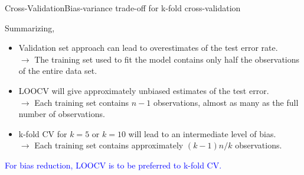 \begin{frame}{Cross-Validation}{Bias-variance trade-oﬀ for k-fold cross-validation}

Summarizing, 

\begin{itemize}
    \item Validation set approach can lead to overestimates of the test error rate. \pause \\
    $\rightarrow$ The training set used to fit the model contains only half the observations of the entire data set. \pause 

    \item LOOCV will give approximately unbiased estimates of the test error. \pause \\
    $\rightarrow$ Each training set contains $n - 1$ observations, almost as many as the full number of observations. \pause

    \item k-fold CV for $k = 5$ or $k = 10$ will lead to an intermediate level of bias. \pause \\ 
    $\rightarrow$ Each training set contains approximately $(k - 1)n/k$ observations. \pause 

\end{itemize}


\textcolor{blue}{For bias reduction, LOOCV is to be preferred to k-fold CV.} 

\end{frame}

